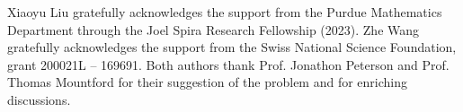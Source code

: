 \documentclass[EJP]{ejpecp} %
\begin{document}
\begin{acks}
Xiaoyu Liu gratefully acknowledges the support from the Purdue Mathematics Department through the Joel Spira Research Fellowship (2023). Zhe Wang gratefully acknowledges the support from the Swiss National Science Foundation, grant 200021L -- 169691. Both authors thank Prof. Jonathon Peterson and Prof. Thomas Mountford for their suggestion of the problem and for enriching discussions.
\end{acks}


\end{document}

